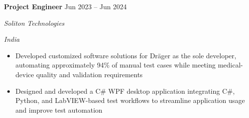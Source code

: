 \documentclass[letterpaper,10pt]{article}
\newlength{\roleheadingright}
\newcommand{\roleheading}[4]{%
  \textbf{#1} \hfill #2\\
  \settowidth{\roleheadingright}{\textit{#4}}%
  \parbox[t]{\dimexpr\linewidth-\roleheadingright-1em\relax}{\raggedright\textit{#3}}%
  \hfill\parbox[t]{\roleheadingright}{\raggedleft\textit{#4}}\vspace{1pt}
}
\newenvironment{resumeitems}{\begin{itemize}}{\end{itemize}}
\begin{document}
\roleheading{Project Engineer}{Jun 2023 -- Jun 2024}{Soliton Technologies}{India}
\begin{resumeitems}
  \item Developed customized software solutions for Dr\"ager as the sole developer, automating approximately 94\% of manual test cases while meeting medical-device quality and validation requirements
  \item Designed and developed a C\# WPF desktop application integrating C\#, Python, and LabVIEW-based test workflows to streamline application usage and improve test automation
\end{resumeitems}
\end{document}
